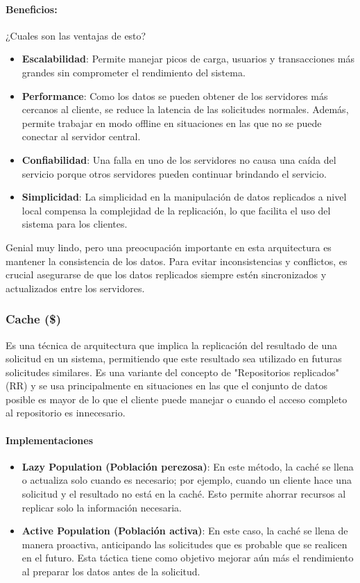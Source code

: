 \documentclass{article}
\begin{document}
 		\paragraph{Beneficios:}
		¿Cuales son las ventajas de esto?
		\begin{itemize}	
			\item {\textbf{Escalabilidad}}: Permite manejar picos de carga, usuarios y transacciones más grandes sin comprometer el rendimiento del sistema.
			\item {\textbf{Performance}}: Como los datos se pueden obtener de los servidores más cercanos al cliente, se reduce la latencia de las solicitudes normales. Además, permite trabajar en modo offline en situaciones en las que no se puede conectar al servidor central.
			\item {\textbf{Confiabilidad}}: Una falla en uno de los servidores no causa una caída del servicio porque otros servidores pueden continuar brindando el servicio.
			
			\item {\textbf{Simplicidad}}: La simplicidad en la manipulación de datos replicados a nivel local compensa la complejidad de la replicación, lo que facilita el uso del sistema para los clientes.
		\end{itemize}
		
		Genial muy lindo, pero una preocupación importante en esta arquitectura es mantener la consistencia de los datos. Para evitar inconsistencias y conflictos, es crucial asegurarse de que los datos replicados siempre estén sincronizados y actualizados entre los servidores.
		
		\subsubsection{Cache (\$)}
		 Es una técnica de arquitectura que implica la replicación del resultado de una solicitud en un sistema, permitiendo que este resultado sea utilizado en futuras solicitudes similares. Es una variante del concepto de "Repositorios replicados" (RR) y se usa principalmente en situaciones en las que el conjunto de datos posible es mayor de lo que el cliente puede manejar o cuando el acceso completo al repositorio es innecesario.
 		\paragraph{Implementaciones}
		 
 		\begin{itemize}	
		 	\item {\textbf{Lazy Population (Población perezosa)}}: En este método, la caché se llena o actualiza solo cuando es necesario; por ejemplo, cuando un cliente hace una solicitud y el resultado no está en la caché. Esto permite ahorrar recursos al replicar solo la información necesaria.
		 	\item {\textbf{Active Population (Población activa)}}: En este caso, la caché se llena de manera proactiva, anticipando las solicitudes que es probable que se realicen en el futuro. Esta táctica tiene como objetivo mejorar aún más el rendimiento al preparar los datos antes de la solicitud.
		 \end{itemize}
		 
\end{document}
